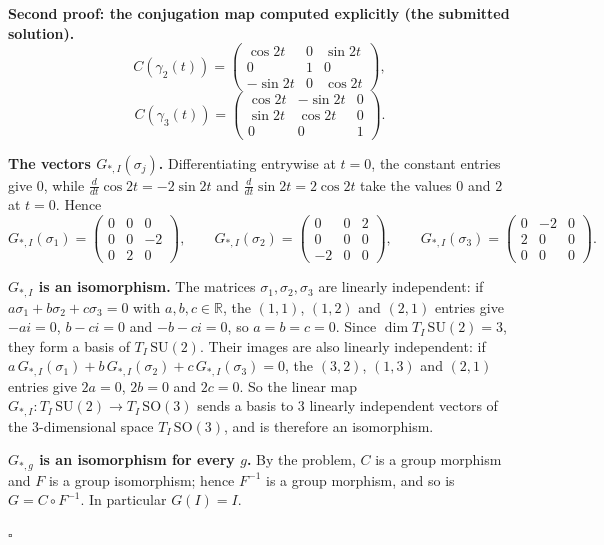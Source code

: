 \documentclass[11pt]{report}
\renewenvironment{proof}[1][Proof]{\noindent\textbf{#1.} }{\hfill$\square$\par\vspace{5pt}}
\begin{document}
\begin{proof}[Second proof: the conjugation map computed explicitly (the submitted solution)]
\[C(\gamma_2(t)) = \begin{pmatrix} \cos 2t & 0 & \sin 2t \\ 0 & 1 & 0 \\ -\sin 2t & 0 & \cos 2t \end{pmatrix},
\]
\[
C(\gamma_3(t)) = \begin{pmatrix} \cos 2t & -\sin 2t & 0 \\ \sin 2t & \cos 2t & 0 \\ 0 & 0 & 1 \end{pmatrix}.
\]

\textbf{The vectors $G_{*,I}(\sigma_j)$.} Differentiating entrywise at $t = 0$, the constant entries give $0$, while $\frac{d}{dt}\cos 2t = -2\sin 2t$ and $\frac{d}{dt}\sin 2t = 2\cos 2t$ take the values $0$ and $2$ at $t = 0$. Hence
\[
G_{*,I}(\sigma_1) = \begin{pmatrix} 0 & 0 & 0 \\ 0 & 0 & -2 \\ 0 & 2 & 0 \end{pmatrix}, \qquad
G_{*,I}(\sigma_2) = \begin{pmatrix} 0 & 0 & 2 \\ 0 & 0 & 0 \\ -2 & 0 & 0 \end{pmatrix}, \qquad
G_{*,I}(\sigma_3) = \begin{pmatrix} 0 & -2 & 0 \\ 2 & 0 & 0 \\ 0 & 0 & 0 \end{pmatrix}.
\]

\textbf{$G_{*,I}$ is an isomorphism.} The matrices $\sigma_1, \sigma_2, \sigma_3$ are linearly independent: if $a\sigma_1 + b\sigma_2 + c\sigma_3 = 0$ with $a, b, c \in \mathbb{R}$, the $(1,1)$, $(1,2)$ and $(2,1)$ entries give $-ai = 0$, $b - ci = 0$ and $-b - ci = 0$, so $a = b = c = 0$. Since $\dim T_I\,\mathrm{SU}(2) = 3$, they form a basis of $T_I\,\mathrm{SU}(2)$. Their images are also linearly independent: if $a\,G_{*,I}(\sigma_1) + b\,G_{*,I}(\sigma_2) + c\,G_{*,I}(\sigma_3) = 0$, the $(3,2)$, $(1,3)$ and $(2,1)$ entries give $2a = 0$, $2b = 0$ and $2c = 0$. So the linear map $G_{*,I} : T_I\,\mathrm{SU}(2) \to T_I\,\mathrm{SO}(3)$ sends a basis to $3$ linearly independent vectors of the $3$-dimensional space $T_I\,\mathrm{SO}(3)$, and is therefore an isomorphism.

\textbf{$G_{*,g}$ is an isomorphism for every $g$.} By the problem, $C$ is a group morphism and $F$ is a group isomorphism; hence $F^{-1}$ is a group morphism, and so is $G = C \circ F^{-1}$. In particular $G(I) = I$.


\end{proof}
\end{document}
